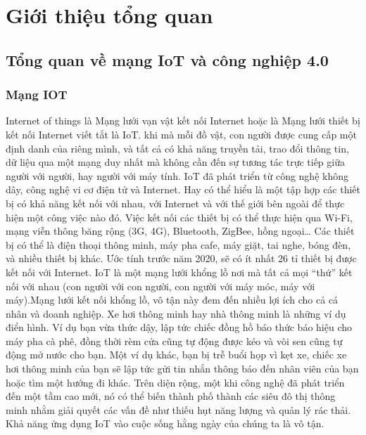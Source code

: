 \newpage
\chapter{Giới thiệu tổng quan}

\section{Tổng quan về mạng IoT và công nghiệp 4.0}

\subsection{Mạng IOT}
Internet of things là Mạng lưới vạn vật kết nối Internet hoặc là Mạng lưới thiết bị kết nối Internet viết tắt là IoT. khi mà mỗi đồ vật, con người được cung cấp một định danh của riêng mình, và tất cả có khả năng truyền tải, trao đổi thông tin, dữ liệu qua một mạng duy nhất mà không cần đến sự tương tác trực tiếp giữa người với người, hay người với máy tính. IoT đã phát triển từ công nghệ không dây, công nghệ vi cơ điện tử và Internet. Hay có thể hiểu là một tập hợp các thiết bị có khả năng kết nối với nhau, với Internet và với thế giới bên ngoài để thực hiện một công việc nào đó. 
\newline
\newline
Việc kết nối các thiết bị có thể thực hiện qua Wi-Fi, mạng viễn thông băng rộng (3G, 4G), Bluetooth, ZigBee, hồng ngoại… Các thiết bị có thể là điện thoại thông minh, máy pha cafe, máy giặt, tai nghe, bóng đèn, và nhiều thiết bị khác\cite{tl1}. 
\newline
\newline
Ước tính trước năm 2020, sẽ có ít nhất 26 tỉ thiết bị được kết nối với Internet. IoT là một mạng lưới khổng lồ nơi mà tất cả mọi “thứ” kết nối với nhau (con người với con người, con người với máy móc, máy với máy).Mạng lưới kết nối khổng lồ, vô tận này đem đến nhiều lợi ích cho cả cá nhân và doanh nghiệp. Xe hơi thông minh hay nhà thông minh là những ví dụ điển hình. Ví dụ bạn vừa thức dậy, lập tức chiếc đồng hồ báo thức báo hiệu cho máy pha cà phê, đồng thời rèm cửa cũng tự động được kéo và vòi sen cũng tự động mở nước cho bạn. Một ví dụ khác, bạn bị trễ buổi họp vì kẹt xe, chiếc xe hơi thông minh của bạn sẽ lập tức gửi tin nhắn thông báo đến nhân viên của bạn hoặc tìm một hướng đi khác. Trên diện rộng, một khi công nghệ đã phát triển đến một tầm cao mới, nó có thể biến thành phố thành các siêu đô thị thông minh nhằm giải quyết các vấn đề như thiếu hụt năng lượng và quản lý rác thải. Khả năng ứng dụng IoT vào cuộc sống hằng ngày của chúng ta là vô tận\cite{tl2}. 

